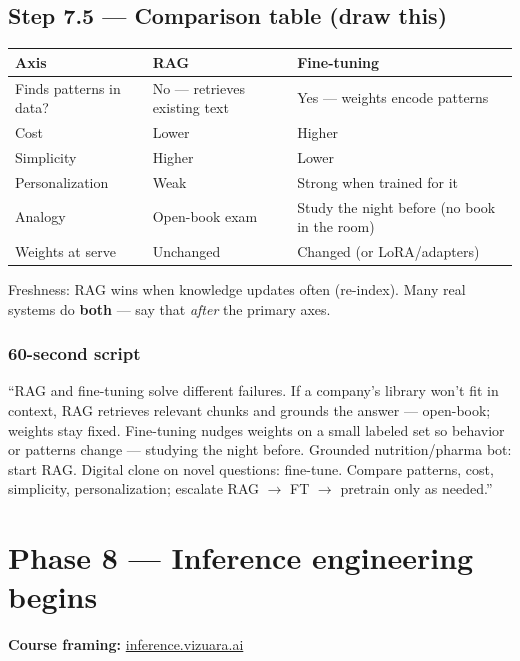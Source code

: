 \documentclass[11pt,a4paper]{article}
\begin{document}
\subsection{Step 7.5 --- Comparison table (draw this)}


\begin{table}[ht]
\centering\small
\begin{tabularx}{\textwidth}{@{}YYY@{}}
\toprule
\textbf{Axis} & \textbf{RAG} & \textbf{Fine-tuning} \\
\midrule
Finds patterns in data? & No --- retrieves existing text & Yes --- weights encode patterns \\
Cost & Lower & Higher \\
Simplicity & Higher & Lower \\
Personalization & Weak & Strong when trained for it \\
Analogy & Open-book exam & Study the night before (no book in the room) \\
Weights at serve & Unchanged & Changed (or LoRA/adapters) \\
\bottomrule
\end{tabularx}
\end{table}


Freshness: RAG wins when knowledge updates often (re-index). Many real systems do \textbf{both} --- say that \textit{after} the primary axes.


\subsubsection{60-second script}

``RAG and fine-tuning solve different failures. If a company's library won't fit in context, RAG retrieves relevant chunks and grounds the answer --- open-book; weights stay fixed. Fine-tuning nudges weights on a small labeled set so behavior or patterns change --- studying the night before. Grounded nutrition/pharma bot: start RAG. Digital clone on novel questions: fine-tune. Compare patterns, cost, simplicity, personalization; escalate RAG $\rightarrow$ FT $\rightarrow$ pretrain only as needed.''


\bigskip


\clearpage
\section{Phase 8 --- Inference engineering begins}


\textbf{Course framing:} \href{https://inference.vizuara.ai/}{inference.vizuara.ai}
\end{document}
